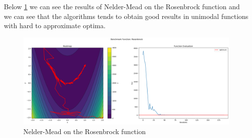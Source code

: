 Below \ref{fig:nm_rosenbrock} we can see the results of Nelder-Mead on the Rosenbrock function and we can see that the algorithms tends to obtain good results in unimodal functions with hard to approximate optima.
\begin{figure}[H]
    \includegraphics[width=\textwidth]{lab1/imgs/nm_rosenbrock.png}
    \caption{Nelder-Mead on the Rosenbrock function}
    \label{fig:nm_rosenbrock}
\end{figure}